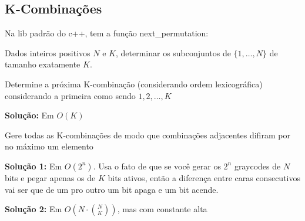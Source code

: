 \subsection{K-Combinações}

Na lib padrão do c++, tem a função next\_permutation:


Dados inteiros positivos $N$ e $K$, determinar os subconjuntos de $\{1, \dots, N\}$ de tamanho exatamente $K$.

 Determine a próxima K-combinação (considerando ordem lexicográfica) considerando a primeira como sendo $1, 2, \dots, K$

\textbf{Solução:} Em $O(K)$


 Gere todas as K-combinações de modo que combinações adjacentes difiram por no máximo um elemento

\textbf{Solução 1:} Em $O(2^n)$. Usa o fato de que se você gerar os $2^n$ graycodes de $N$ bits e pegar apenas os de $K$ bits ativos, então a diferença entre caras consecutivos vai ser que de um pro outro um bit apaga e um bit acende.


\textbf{Solução 2:} Em $O\left( N \cdot {N \choose K} \right)$, mas com constante alta

